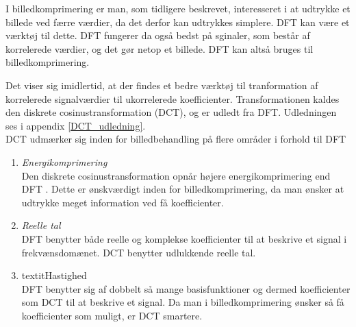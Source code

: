 I billedkomprimering er man, som tidligere beskrevet, interesseret i at udtrykke et billede ved færre værdier, da det derfor kan udtrykkes simplere. DFT kan være et værktøj til dette. DFT fungerer da også bedst på sginaler, som består af korrelerede værdier, og det gør netop et billede. DFT kan altså bruges til billedkomprimering.

Det viser sig imidlertid, at der findes et bedre værktøj til tranformation af korrelerede signalværdier til ukorrelerede koefficienter. Transformationen kaldes den diskrete cosinustransformation (DCT), og er udledt fra DFT. Udledningen ses i appendix \vref{DCT_udledning}.\\
DCT udmærker sig inden for billedbehandling på flere områder i forhold til DFT
\begin{enumerate}
	\item{\textit{Energikomprimering}\\
	Den diskrete cosinustransformation opnår højere energikomprimering end DFT \citep{smcnus_energy}. Dette er ønskværdigt inden for billedkomprimering, da man ønsker at udtrykke meget information ved få koefficienter.}
	\item{\textit{Reelle tal}\\
	DFT benytter både reelle og komplekse koefficienter til at beskrive et signal i frekvænsdomænet. DCT benytter udlukkende reelle tal. }
	\item{textit{Hastighed}\\
	DFT benytter sig af dobbelt så mange basisfunktioner og dermed koefficienter som DCT til at beskrive et signal. Da man i billedkomprimering ønsker så få koefficienter som muligt, er DCT smartere.}
\end{enumerate}

